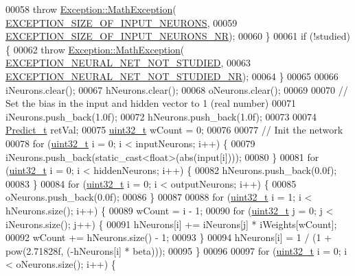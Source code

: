 \begin{DoxyCode}
00058     \textcolor{keywordflow}{throw} \hyperlink{class_soil_math_1_1_exception_1_1_math_exception}{Exception::MathException}(
      \hyperlink{_math_exception_8h_ab0eb22f73fea0163f06029cbc3f05825}{EXCEPTION\_SIZE\_OF\_INPUT\_NEURONS},
00059                                    \hyperlink{_math_exception_8h_ad3576b2d374be2f14816abdf843432c7}{EXCEPTION\_SIZE\_OF\_INPUT\_NEURONS\_NR});
00060   \}
00061   \textcolor{keywordflow}{if} (!studied) \{
00062     \textcolor{keywordflow}{throw} \hyperlink{class_soil_math_1_1_exception_1_1_math_exception}{Exception::MathException}(
      \hyperlink{_math_exception_8h_ac412424987d9143f59b48a2cf9e0c21b}{EXCEPTION\_NEURAL\_NET\_NOT\_STUDIED},
00063                                    \hyperlink{_math_exception_8h_a3afb80cde76bdd1c929d352c41efabc8}{EXCEPTION\_NEURAL\_NET\_NOT\_STUDIED\_NR});
00064   \}
00065 
00066   iNeurons.clear();
00067   hNeurons.clear();
00068   oNeurons.clear();
00069 
00070   \textcolor{comment}{// Set the bias in the input and hidden vector to 1 (real number)}
00071   iNeurons.push\_back(1.0f);
00072   hNeurons.push\_back(1.0f);
00073 
00074   \hyperlink{struct_predict__struct}{Predict\_t} retVal;
00075   \hyperlink{_soil_math_types_8h_a435d1572bf3f880d55459d9805097f62}{uint32\_t} wCount = 0;
00076 
00077   \textcolor{comment}{// Init the network}
00078   \textcolor{keywordflow}{for} (\hyperlink{_soil_math_types_8h_a435d1572bf3f880d55459d9805097f62}{uint32\_t} i = 0; i < inputNeurons; i++) \{
00079     iNeurons.push\_back(static\_cast<float>(abs(input[i])));
00080   \}
00081   \textcolor{keywordflow}{for} (\hyperlink{_soil_math_types_8h_a435d1572bf3f880d55459d9805097f62}{uint32\_t} i = 0; i < hiddenNeurons; i++) \{
00082     hNeurons.push\_back(0.0f);
00083   \}
00084   \textcolor{keywordflow}{for} (\hyperlink{_soil_math_types_8h_a435d1572bf3f880d55459d9805097f62}{uint32\_t} i = 0; i < outputNeurons; i++) \{
00085     oNeurons.push\_back(0.0f);
00086   \}
00087 
00088   \textcolor{keywordflow}{for} (\hyperlink{_soil_math_types_8h_a435d1572bf3f880d55459d9805097f62}{uint32\_t} i = 1; i < hNeurons.size(); i++) \{
00089     wCount = i - 1;
00090     \textcolor{keywordflow}{for} (\hyperlink{_soil_math_types_8h_a435d1572bf3f880d55459d9805097f62}{uint32\_t} j = 0; j < iNeurons.size(); j++) \{
00091       hNeurons[i] += iNeurons[j] * iWeights[wCount];
00092       wCount += hNeurons.size() - 1;
00093     \}
00094     hNeurons[i] = 1 / (1 + pow(2.71828f, (-hNeurons[i] * beta)));
00095   \}
00096 
00097   \textcolor{keywordflow}{for} (\hyperlink{_soil_math_types_8h_a435d1572bf3f880d55459d9805097f62}{uint32\_t} i = 0; i < oNeurons.size(); i++) \{

\end{DoxyCode}
